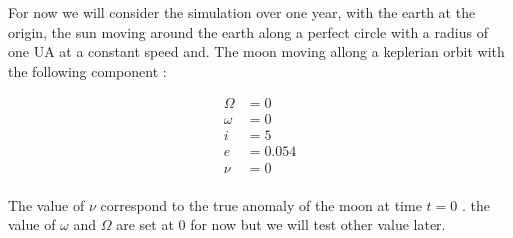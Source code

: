 \documentclass{article} %
\begin{document}
		For now we will consider the simulation over one year, with the earth at the origin, the sun moving around the earth along a perfect circle with a radius of one UA at a constant speed and. The moon moving allong a keplerian orbit with the following component :
		
		$$
		\begin{align}
			\Omega&=0\\
			\omega&=0\\
			i&=5\\
			e&=0.054\\
			\nu&=0\\
		\end{align}
		$$
		
		The value of $\nu$ correspond to the true anomaly of the moon at time $t=0$ . the value of $\omega$ and $\Omega$ are set at 0 for now but we will test other value later.
		
		
\end{document}
